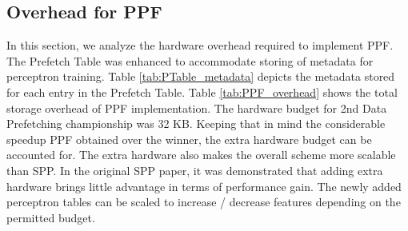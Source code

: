 \subsection{Overhead for PPF}
\label{Method-Overheads}
In this section, we analyze the hardware overhead required to
implement PPF. The Prefetch Table was enhanced to accommodate storing
of metadata for perceptron training. Table \ref{tab:PTable_metadata}
depicts the metadata stored for each entry in the Prefetch Table.
Table \ref{tab:PPF_overhead} shows the total storage overhead of PPF
implementation. The hardware budget for 2nd Data Prefetching
championship was 32 KB.  Keeping that in mind the considerable speedup
PPF obtained over the winner, the extra hardware budget can be
accounted for. The extra hardware also makes the overall scheme more
scalable than SPP. In the original SPP paper, it was demonstrated that
adding extra hardware brings little advantage in terms of performance
gain. The newly added perceptron tables can be scaled to increase /
decrease features depending on the permitted budget.

